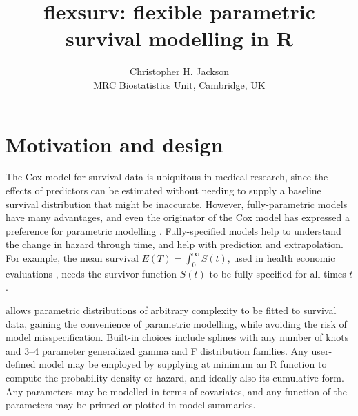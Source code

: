\documentclass[nojss,nofooter]{jss}
\author{Christopher H. Jackson \\ MRC Biostatistics Unit, Cambridge, UK \\ \email{chris.jackson@mrc-bsu.cam.ac.uk}}
\title{flexsurv: flexible parametric survival modelling in R}
\begin{document}
\section{Motivation and design}

The Cox model for survival data is ubiquitous in medical research, since the effects of
predictors can be estimated without needing to supply a
baseline survival distribution that might be inaccurate.  However,
fully-parametric models have many advantages, and even the originator
of the Cox model has expressed a preference for parametric modelling
\citep{reid:cox:conversation}.  Fully-specified models help to
understand the change in hazard through time, and help with prediction
and extrapolation. For example, the mean survival $E(T) =
\int_0^{\infty}S(t)$, used in health economic
evaluations \citep{latimer2013survival}, needs the survivor function
$S(t)$ to be fully-specified for all times $t$.


 allows parametric distributions of
arbitrary complexity to be fitted to survival data, gaining the
convenience of parametric modelling, while avoiding the risk of model
misspecification.  Built-in choices include splines with any number of
knots \citep{royston:parmar} and 3--4 parameter generalized gamma and
F distribution families.  Any user-defined model may be employed by
supplying at minimum an R function to compute the probability density
or hazard, and ideally also its cumulative form.  Any parameters may
be modelled in terms of covariates, and any function of the parameters
may be printed or plotted in model summaries.
\end{document}
